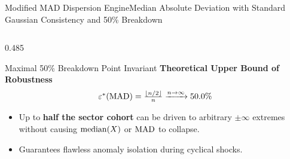 \begin{frame}{Modified MAD Dispersion Engine}{Median Absolute Deviation with Standard Gaussian Consistency and 50\% Breakdown}
\begin{columns}[T,onlytextwidth]
\begin{column}{0.485\textwidth}
            \vspace{0.12cm}

            \begin{quantcard}[height=2.74cm]{Maximal 50\% Breakdown Point Invariant}
                \fontsize{5.8pt}{7.0pt}\selectfont
                \textbf{\color{deepemerald}Theoretical Upper Bound of Robustness}
                \begin{equation*}
                    \textstyle \varepsilon^*(\operatorname{MAD}) = \frac{\lfloor n/2 \rfloor}{n} \xrightarrow{n \to \infty} 50.0\%
                \end{equation*}
                \begin{itemize}
                    \setlength{\itemsep}{1.2pt}
                    \item Up to \textbf{half the sector cohort} can be driven to arbitrary $\pm\infty$ extremes without causing $\operatorname{median}(X)$ or $\operatorname{MAD}$ to collapse.
                    \item Guarantees flawless anomaly isolation during cyclical shocks.
                \end{itemize}
            \end{quantcard}
        \end{column}
    \end{columns}
\end{frame}
